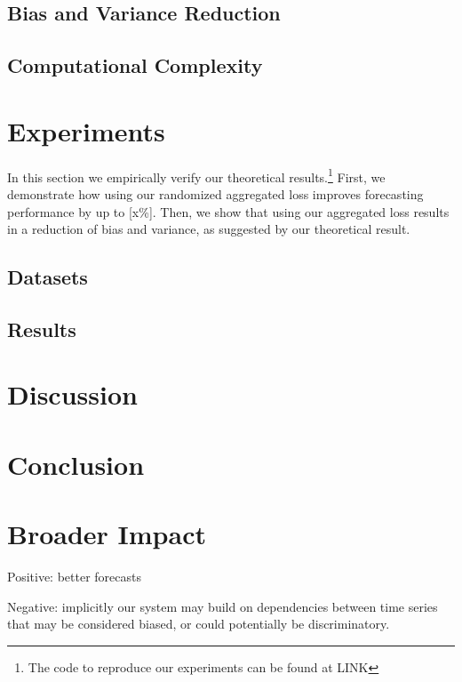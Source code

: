 \documentclass{article}
\begin{document}
  \subsection{Bias and Variance Reduction}
    \label{subsec:biasandvariance}

  \subsection{Computational Complexity}
    \label{subsec:complexity}

\section{Experiments}
  \label{sec:experiments}
  In this section we empirically verify our theoretical results.\footnote{The code to reproduce our experiments can be found at LINK} First, we demonstrate how using our randomized aggregated loss improves forecasting performance by up to [x\%]. Then, we show that using our aggregated loss results in a reduction of bias and variance, as suggested by our theoretical result.

  \subsection{Datasets}
    \label{subsec:datasets}

  \subsection{Results}
    \label{subsec:results}

\section{Discussion}
  \label{sec:discussion}


\section{Conclusion}
  \label{sec:conclusion}


\section*{Broader Impact}

  Positive: better forecasts

  Negative: implicitly our system may build on dependencies between time series that may be considered biased, or could potentially be discriminatory. 
\end{document}
